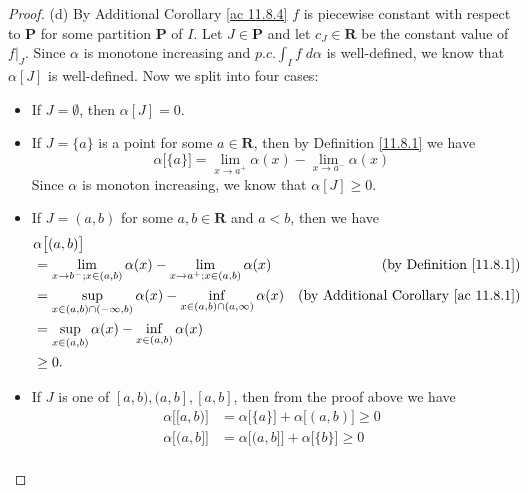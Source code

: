\begin{proof}{(d)}
    By Additional Corollary \ref{ac 11.8.4} \(f\) is piecewise constant with respect to \(\mathbf{P}\) for some partition \(\mathbf{P}\) of \(I\).
    Let \(J \in \mathbf{P}\) and let \(c_J \in \mathbf{R}\) be the constant value of \(f|_J\).
    Since \(\alpha\) is monotone increasing and \(p.c. \int_I f \; d \alpha\) is well-defined, we know that \(\alpha[J]\) is well-defined.
    Now we split into four cases:
    \begin{itemize}
        \item If \(J = \emptyset\), then \(\alpha[J] = 0\).
        \item If \(J = \{a\}\) is a point for some \(a \in \mathbf{R}\), then by Definition \ref{11.8.1} we have
              \[
                  \alpha\big[\{a\}\big] = \lim_{x \to a^+} \alpha(x) - \lim_{x \to a^-} \alpha(x)
              \]
              Since \(\alpha\) is monoton increasing, we know that \(\alpha[J] \geq 0\).
        \item If \(J = (a, b)\) for some \(a, b \in \mathbf{R}\) and \(a < b\), then we have
              \begin{align*}
                   & \alpha\big[(a, b)\big]                                                                                                                                \\
                   & = \lim_{x \to b^- ; x \in (a, b)} \alpha(x) - \lim_{x \to a^+ ; x \in (a, b)} \alpha(x)            & \text{(by Definition \ref{11.8.1})}              \\
                   & = \sup_{x \in (a, b) \cap (-\infty, b)} \alpha(x) - \inf_{x \in (a, b) \cap (a, \infty)} \alpha(x) & \text{(by Additional Corollary \ref{ac 11.8.1})} \\
                   & = \sup_{x \in (a, b)} \alpha(x) - \inf_{x \in (a, b)} \alpha(x)                                                                                       \\
                   & \geq 0.
              \end{align*}
        \item If \(J\) is one of \([a, b), (a, b], [a, b]\), then from the proof above we have
              \begin{align*}
                  \alpha\big[[a, b)\big] & = \alpha\big[\{a\}\big] + \alpha\big[(a, b)\big] \geq 0 \\
                  \alpha\big[(a, b]\big] & = \alpha\big[(a, b]\big] + \alpha\big[\{b\}\big] \geq 0 \\

\end{align*}
\end{itemize}
\end{proof}
